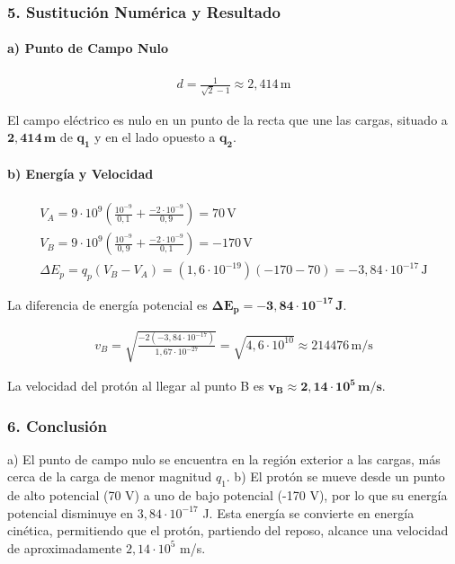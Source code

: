 \subsubsection*{5. Sustitución Numérica y Resultado}
\paragraph*{a) Punto de Campo Nulo}
\begin{gather}
    d = \frac{1}{\sqrt{2}-1} \approx 2,414 \, \text{m}
\end{gather}
\begin{cajaresultado}
El campo eléctrico es nulo en un punto de la recta que une las cargas, situado a $\boldsymbol{2,414 \, m}$ de $\boldsymbol{q_1}$ y en el lado opuesto a $\boldsymbol{q_2}$.
\end{cajaresultado}
\paragraph*{b) Energía y Velocidad}
\begin{gather}
    V_A = 9\cdot10^9 \left(\frac{10^{-9}}{0,1} + \frac{-2\cdot10^{-9}}{0,9}\right) = 70 \, \text{V} \\
    V_B = 9\cdot10^9 \left(\frac{10^{-9}}{0,9} + \frac{-2\cdot10^{-9}}{0,1}\right) =  -170 \, \text{V} \\
    \Delta E_p = q_p (V_B - V_A) = (1,6\cdot10^{-19})(-170 - 70) =  -3,84 \cdot 10^{-17} \, \text{J}
\end{gather}
\begin{cajaresultado}
La diferencia de energía potencial es $\boldsymbol{\Delta E_p = -3,84 \cdot 10^{-17} \, J}$.
\end{cajaresultado}
\begin{gather}
    v_B = \sqrt{\frac{-2(-3,84 \cdot 10^{-17})}{1,67 \cdot 10^{-27}}} = \sqrt{4,6 \cdot 10^{10}} \approx 214476 \, \text{m/s}
\end{gather}
\begin{cajaresultado}
La velocidad del protón al llegar al punto B es $\boldsymbol{v_B \approx 2,14 \cdot 10^5 \, m/s}$.
\end{cajaresultado}

\subsubsection*{6. Conclusión}
\begin{cajaconclusion}
a) El punto de campo nulo se encuentra en la región exterior a las cargas, más cerca de la carga de menor magnitud $q_1$.
b) El protón se mueve desde un punto de alto potencial (70 V) a uno de bajo potencial (-170 V), por lo que su energía potencial disminuye en $3,84 \cdot 10^{-17}$ J. Esta energía se convierte en energía cinética, permitiendo que el protón, partiendo del reposo, alcance una velocidad de aproximadamente $2,14 \cdot 10^5$ m/s.
\end{cajaconclusion}

